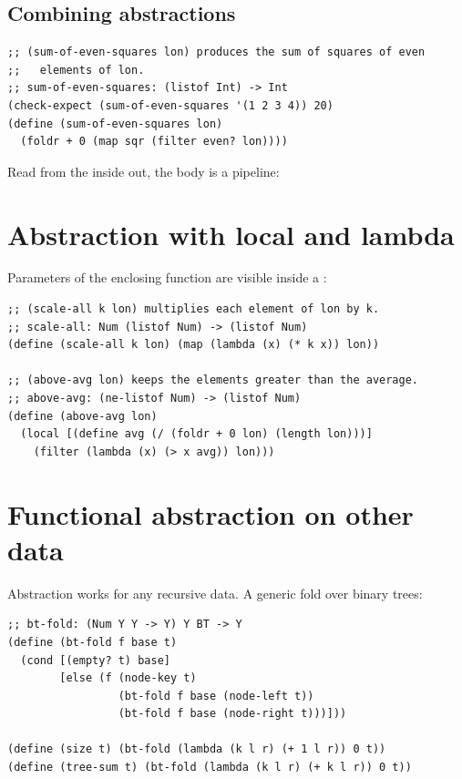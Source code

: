 \subsection{Combining abstractions}
\begin{lstlisting}[style=racket]
;; (sum-of-even-squares lon) produces the sum of squares of even
;;   elements of lon.
;; sum-of-even-squares: (listof Int) -> Int
(check-expect (sum-of-even-squares '(1 2 3 4)) 20)
(define (sum-of-even-squares lon)
  (foldr + 0 (map sqr (filter even? lon))))
\end{lstlisting}

Read from the inside out, the body is a pipeline:

\begin{center}
\end{center}

\section{Abstraction with local and lambda}
Parameters of the enclosing function are visible inside a :
\begin{lstlisting}[style=racket]
;; (scale-all k lon) multiplies each element of lon by k.
;; scale-all: Num (listof Num) -> (listof Num)
(define (scale-all k lon) (map (lambda (x) (* k x)) lon))

;; (above-avg lon) keeps the elements greater than the average.
;; above-avg: (ne-listof Num) -> (listof Num)
(define (above-avg lon)
  (local [(define avg (/ (foldr + 0 lon) (length lon)))]
    (filter (lambda (x) (> x avg)) lon)))
\end{lstlisting}

\section{Functional abstraction on other data}
Abstraction works for any recursive data. A generic fold over binary trees:
\begin{lstlisting}[style=racket]
;; bt-fold: (Num Y Y -> Y) Y BT -> Y
(define (bt-fold f base t)
  (cond [(empty? t) base]
        [else (f (node-key t)
                 (bt-fold f base (node-left t))
                 (bt-fold f base (node-right t)))]))

(define (size t) (bt-fold (lambda (k l r) (+ 1 l r)) 0 t))
(define (tree-sum t) (bt-fold (lambda (k l r) (+ k l r)) 0 t))
\end{lstlisting}

